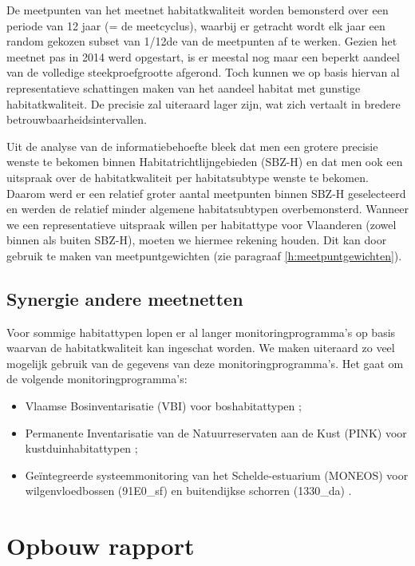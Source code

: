 \documentclass[twoside]{extreport}
\begin{document}
De meetpunten van het meetnet habitatkwaliteit worden bemonsterd over
een periode van 12 jaar (= de meetcyclus), waarbij er getracht wordt elk
jaar een random gekozen subset van 1/12de van de meetpunten af te
werken. Gezien het meetnet pas in 2014 werd opgestart, is er meestal nog
maar een beperkt aandeel van de volledige steekproefgrootte afgerond.
Toch kunnen we op basis hiervan al representatieve schattingen maken van
het aandeel habitat met gunstige habitatkwaliteit. De precisie zal
uiteraard lager zijn, wat zich vertaalt in bredere
betrouwbaarheidsintervallen.

Uit de analyse van de informatiebehoefte \citep{Adriaens2011} bleek dat
men een grotere precisie wenste te bekomen binnen
Habitatrichtlijngebieden (SBZ-H) en dat men ook een uitspraak over de
habitatkwaliteit per habitatsubtype wenste te bekomen. Daarom werd er
een relatief groter aantal meetpunten binnen SBZ-H geselecteerd en
werden de relatief minder algemene habitatsubtypen overbemonsterd.
Wanneer we een representatieve uitspraak willen per habitattype voor
Vlaanderen (zowel binnen als buiten SBZ-H), moeten we hiermee rekening
houden. Dit kan door gebruik te maken van meetpuntgewichten (zie
paragraaf \ref{h:meetpuntgewichten}).

\subsection{Synergie andere
meetnetten}\label{synergie-andere-meetnetten}

Voor sommige habitattypen lopen er al langer monitoringprogramma's op
basis waarvan de habitatkwaliteit kan ingeschat worden. We maken
uiteraard zo veel mogelijk gebruik van de gegevens van deze
monitoringprogramma's. Het gaat om de volgende monitoringprogramma's:

\begin{itemize}
\tightlist
\item
  Vlaamse Bosinventarisatie (VBI) voor boshabitattypen
  \citep{Wouters2008c};
\item
  Permanente Inventarisatie van de Natuurreservaten aan de Kust (PINK)
  voor kustduinhabitattypen \citep{Provoost2015};
\item
  Geïntegreerde systeemmonitoring van het Schelde-estuarium (MONEOS)
  voor wilgenvloedbossen (91E0\_sf) en buitendijkse schorren (1330\_da)
  \citep{VanRyckegem2018}.
\end{itemize}

\section{Opbouw rapport}\label{opbouw-rapport}
\end{document}
